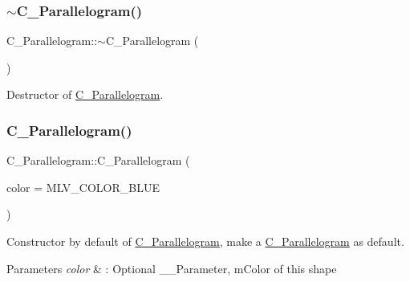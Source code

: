 \subsubsection{\texorpdfstring{$\sim$\+C\+\_\+\+Parallelogram()}{~C\_Parallelogram()}\hspace{0.1cm}{\footnotesize\ttfamily [2/2]}}
{\footnotesize\ttfamily C\+\_\+\+Parallelogram\+::$\sim$\+C\+\_\+\+Parallelogram (\begin{DoxyParamCaption}{ }\end{DoxyParamCaption})\hspace{0.3cm}{\ttfamily [override]}}



Destructor of \hyperlink{classC__Parallelogram}{C\+\_\+\+Parallelogram}. 

\mbox{\label{classC__Parallelogram_a85d543d3a3a118676e7e47cff7ce82be}} 
\subsubsection{\texorpdfstring{C\+\_\+\+Parallelogram()}{C\_Parallelogram()}\hspace{0.1cm}{\footnotesize\ttfamily [4/6]}}
{\footnotesize\ttfamily C\+\_\+\+Parallelogram\+::\+C\+\_\+\+Parallelogram (\begin{DoxyParamCaption}\item[{M\+L\+V\+\_\+\+Color}]{color = {\ttfamily MLV\+\_\+COLOR\+\_\+BLUE} }\end{DoxyParamCaption})\hspace{0.3cm}{\ttfamily [explicit]}}



Constructor by default of \hyperlink{classC__Parallelogram}{C\+\_\+\+Parallelogram}, make a \hyperlink{classC__Parallelogram}{C\+\_\+\+Parallelogram} as default. 


\begin{DoxyParams}{Parameters}
{\em color} & \+: Optional \+\_\+\+\_\+\+Parameter, m\+Color of this shape \\
\hline
\end{DoxyParams}
\mbox{\label{classC__Parallelogram_a6e31f5dcaf076ca4b745c0b0108bb809}} 
